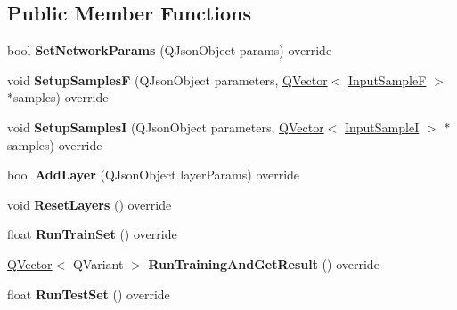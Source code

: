 \subsection*{Public Member Functions}
\begin{DoxyCompactItemize}
\item 
bool {\bfseries Set\+Network\+Params} (Q\+Json\+Object params) override\hypertarget{class_a_r_t_network_ab473057b03bf299702c879dff08a6128}{}\label{class_a_r_t_network_ab473057b03bf299702c879dff08a6128}

\item 
void {\bfseries Setup\+SamplesF} (Q\+Json\+Object parameters, \hyperlink{class_q_vector}{Q\+Vector}$<$ \hyperlink{class_q_pair}{Input\+SampleF} $>$ $\ast$samples) override\hypertarget{class_a_r_t_network_a7e6818c24d13b718d6d8807db46b0016}{}\label{class_a_r_t_network_a7e6818c24d13b718d6d8807db46b0016}

\item 
void {\bfseries Setup\+SamplesI} (Q\+Json\+Object parameters, \hyperlink{class_q_vector}{Q\+Vector}$<$ \hyperlink{class_q_pair}{Input\+SampleI} $>$ $\ast$samples) override\hypertarget{class_a_r_t_network_a1f5750542a93bffeedacf74f780a2f2b}{}\label{class_a_r_t_network_a1f5750542a93bffeedacf74f780a2f2b}

\item 
bool {\bfseries Add\+Layer} (Q\+Json\+Object layer\+Params) override\hypertarget{class_a_r_t_network_a6025aa2fef98b81bc1dd9346fee1fd14}{}\label{class_a_r_t_network_a6025aa2fef98b81bc1dd9346fee1fd14}

\item 
void {\bfseries Reset\+Layers} () override\hypertarget{class_a_r_t_network_aa2ceed6fcdc4c73d0715d09881196569}{}\label{class_a_r_t_network_aa2ceed6fcdc4c73d0715d09881196569}

\item 
float {\bfseries Run\+Train\+Set} () override\hypertarget{class_a_r_t_network_affab976a674fe5c0626ce0adc896ba2b}{}\label{class_a_r_t_network_affab976a674fe5c0626ce0adc896ba2b}

\item 
\hyperlink{class_q_vector}{Q\+Vector}$<$ Q\+Variant $>$ {\bfseries Run\+Training\+And\+Get\+Result} () override\hypertarget{class_a_r_t_network_a2e9df6184463673c7620bd079609d727}{}\label{class_a_r_t_network_a2e9df6184463673c7620bd079609d727}

\item 
float {\bfseries Run\+Test\+Set} () override\hypertarget{class_a_r_t_network_ada8fa0752d7404bdac17955f23d1cf1a}{}\label{class_a_r_t_network_ada8fa0752d7404bdac17955f23d1cf1a}

\end{DoxyCompactItemize}
